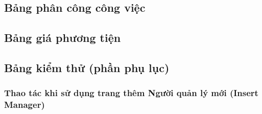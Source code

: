 \documentclass{article}
\begin{document}
\subsection{Bảng phân công công việc}

\subsection{Bảng giá phương tiện}

\subsection{Bảng kiểm thử (phần phụ lục)}
\subsubsection{Thao tác khi sử dụng trang thêm Người quản lý mới (Insert Manager)}
\end{document}
